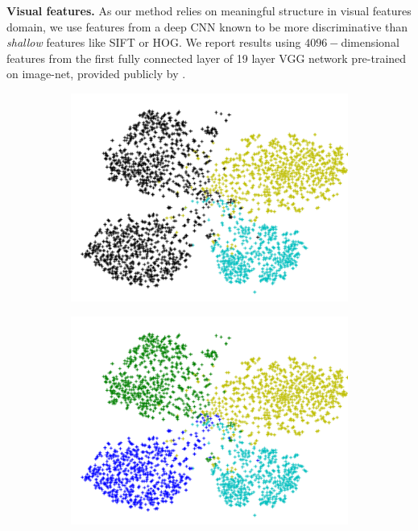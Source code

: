 \documentclass[10pt,twocolumn,letterpaper]{article}
\begin{document}
\textbf{Visual features.}
As our method relies on meaningful structure in visual features domain, we use features from a deep CNN known to be
 more discriminative than \textit{shallow} features like SIFT or HOG. We report results using
  $4096-$dimensional features from the first fully connected layer of 19 layer VGG network \cite{vgg}
pre-trained on image-net, provided publicly by \cite{sse}.
\begin{figure}[t]
  \centering
  \begin{subfigure}[b]{0.25\linewidth}
    \includegraphics[width=\linewidth]{none}
    \caption{}
    \label{fig:null}
  \end{subfigure}
%
  \begin{subfigure}[b]{0.25\linewidth}
    \includegraphics[width=\linewidth]{truth}

\end{subfigure}
\end{figure}
\end{document}
